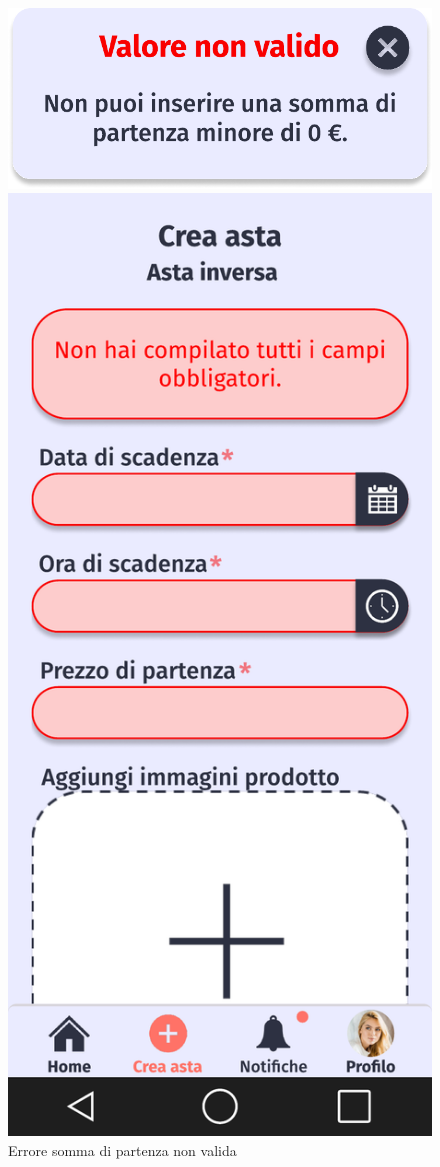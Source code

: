         \begin{figure}[!htb]
            \begin{minipage}{0.32\textwidth}
                \centering
                \includegraphics[width=.7\linewidth]{Immagini/Frames/Popup/P10.pdf}
                \caption{Errore somma di partenza non valida}
            \end{minipage}\hfill
            \begin{minipage}{0.32\textwidth}
                \centering
                \includegraphics[width=.7\linewidth]{Immagini/Frames/Errori/E12.pdf}

\end{minipage}
\end{figure}
